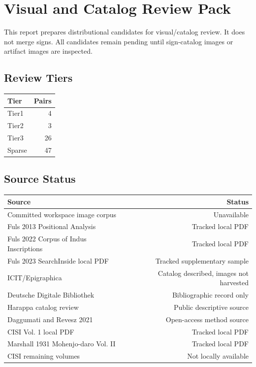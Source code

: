 ﻿\documentclass[11pt,a4paper]{article}
\begin{document}
\section*{Visual and Catalog Review Pack}

This report prepares distributional candidates for visual/catalog review. It does not merge signs. All candidates remain pending until sign-catalog images or artifact images are inspected.

\subsection*{Review Tiers}
\begin{center}
\begin{tabular}{lr}
\toprule
\textbf{Tier} & \textbf{Pairs} \\
\midrule
Tier1 & 4 \\
Tier2 & 3 \\
Tier3 & 26 \\
Sparse & 47 \\
\bottomrule
\end{tabular}
\end{center}

\subsection*{Source Status}
\begin{center}
\begin{tabular}{lr}
\toprule
\textbf{Source} & \textbf{Status} \\
\midrule
Committed workspace image corpus & Unavailable \\
Fuls 2013 Positional Analysis & Tracked local PDF \\
Fuls 2022 Corpus of Indus Inscriptions & Tracked local PDF \\
Fuls 2023 SearchInside local PDF & Tracked supplementary sample \\
ICIT/Epigraphica & Catalog described, images not harvested \\
Deutsche Digitale Bibliothek & Bibliographic record only \\
Harappa catalog review & Public descriptive source \\
Daggumati and Revesz 2021 & Open-access method source \\
CISI Vol. 1 local PDF & Tracked local PDF \\
Marshall 1931 Mohenjo-daro Vol. II & Tracked local PDF \\
CISI remaining volumes & Not locally available \\
\bottomrule
\end{tabular}
\end{center}
\end{document}
